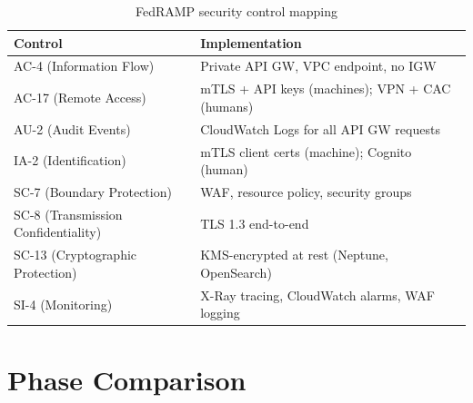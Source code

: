 \documentclass[11pt,letterpaper]{article}
\begin{document}
\begin{table}[H]
\centering
\begin{tabularx}{\textwidth}{lX}
\toprule
\textbf{Control} & \textbf{Implementation} \\
\midrule
AC-4 (Information Flow) & Private API GW, VPC endpoint, no IGW \\
AC-17 (Remote Access) & mTLS + API keys (machines); VPN + CAC (humans) \\
AU-2 (Audit Events) & CloudWatch Logs for all API GW requests \\
IA-2 (Identification) & mTLS client certs (machine); Cognito (human) \\
SC-7 (Boundary Protection) & WAF, resource policy, security groups \\
SC-8 (Transmission Confidentiality) & TLS 1.3 end-to-end \\
SC-13 (Cryptographic Protection) & KMS-encrypted at rest (Neptune, OpenSearch) \\
SI-4 (Monitoring) & X-Ray tracing, CloudWatch alarms, WAF logging \\
\bottomrule
\end{tabularx}
\caption{FedRAMP security control mapping}
\end{table}

\section{Phase Comparison}
\end{document}
